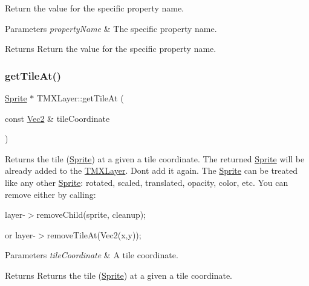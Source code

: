 Return the value for the specific property name.


\begin{DoxyParams}{Parameters}
{\em property\+Name} & The specific property name. \\
\hline
\end{DoxyParams}
\begin{DoxyReturn}{Returns}
Return the value for the specific property name. 
\end{DoxyReturn}
\mbox{\label{classTMXLayer_a3766adcc9f0d3619c97620b7e1cf04dc}} 
\subsubsection{\texorpdfstring{get\+Tile\+At()}{getTileAt()}\hspace{0.1cm}{\footnotesize\ttfamily [1/2]}}
{\footnotesize\ttfamily \hyperlink{classSprite}{Sprite} $\ast$ T\+M\+X\+Layer\+::get\+Tile\+At (\begin{DoxyParamCaption}\item[{const \hyperlink{classVec2}{Vec2} \&}]{tile\+Coordinate }\end{DoxyParamCaption})}

Returns the tile (\hyperlink{classSprite}{Sprite}) at a given a tile coordinate. The returned \hyperlink{classSprite}{Sprite} will be already added to the \hyperlink{classTMXLayer}{T\+M\+X\+Layer}. Don\textquotesingle{}t add it again. The \hyperlink{classSprite}{Sprite} can be treated like any other \hyperlink{classSprite}{Sprite}\+: rotated, scaled, translated, opacity, color, etc. You can remove either by calling\+:
\begin{DoxyItemize}
\item layer-\/$>$remove\+Child(sprite, cleanup);
\item or layer-\/$>$remove\+Tile\+At(\+Vec2(x,y));
\end{DoxyItemize}


\begin{DoxyParams}{Parameters}
{\em tile\+Coordinate} & A tile coordinate. \\
\hline
\end{DoxyParams}
\begin{DoxyReturn}{Returns}
Returns the tile (\hyperlink{classSprite}{Sprite}) at a given a tile coordinate. 
\end{DoxyReturn}
\mbox{\label{classTMXLayer_ad8a1eaf52658b06dead572393bf2b386}} 
